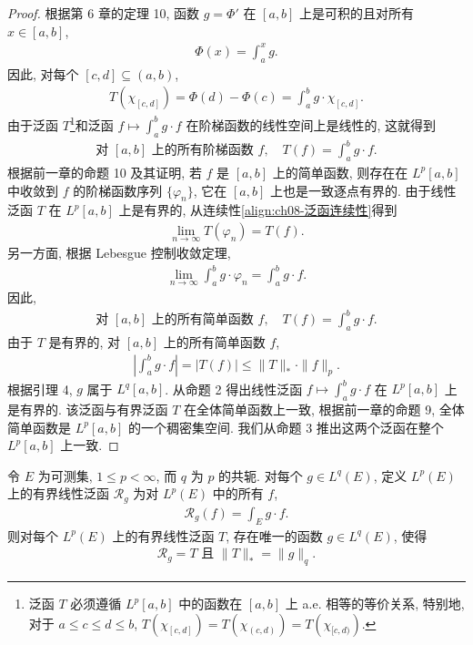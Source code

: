 \documentclass[../../main.tex]{subfiles}
\begin{document}
\begin{proof}
根据第 6 章的定理 10, 函数 $g=\Phi'$ 在 $[a,b]$ 上是可积的且对所有 $x\in[a,b]$,
\begin{align*}
\Phi(x)=\int_{a}^{x}g.
\end{align*}
因此, 对每个 $[c,d]\subseteq(a,b)$,
\begin{align*}
T(\chi_{[c,d]})=\Phi(d)-\Phi(c)=\int_{a}^{b}g\cdot\chi_{[c,d]}.
\end{align*}
由于泛函 $T$\footnote{泛函 $T$ 必须遵循 $L^{p}[a,b]$ 中的函数在 $[a,b]$ 上 a.e. 相等的等价关系, 特别地, 对于 $a\leqslant c\leqslant d\leqslant b$, $T(\chi_{[c,d]})=T(\chi_{(c,d)})=T(\chi_{[c,d)})$.}和泛函 $f\mapsto\int_{a}^{b}g\cdot f$ 在阶梯函数的线性空间上是线性的, 这就得到
\begin{align*}
\text{对 }[a,b]\text{ 上的所有阶梯函数 }f,\quad T(f)=\int_{a}^{b}g\cdot f.
\end{align*}
根据前一章的命题 10 及其证明, 若 $f$ 是 $[a,b]$ 上的简单函数, 则存在在 $L^{p}[a,b]$ 中收敛到 $f$ 的阶梯函数序列 $\{\varphi_{n}\}$, 它在 $[a,b]$ 上也是一致逐点有界的. 由于线性泛函 $T$ 在 $L^{p}[a,b]$ 上是有界的, 从连续性\eqref{align:ch08-泛函连续性}得到
\begin{align*}
\lim_{n\to\infty}T(\varphi_{n})=T(f).
\end{align*}
另一方面, 根据 Lebesgue 控制收敛定理,
\begin{align*}
\lim_{n\to\infty}\int_{a}^{b}g\cdot\varphi_{n}=\int_{a}^{b}g\cdot f.
\end{align*}
因此,
\begin{align*}
\text{对 }[a,b]\text{ 上的所有简单函数 }f,\quad T(f)=\int_{a}^{b}g\cdot f.
\end{align*}
由于 $T$ 是有界的, 对 $[a,b]$ 上的所有简单函数 $f$,
\begin{align*}
\left|\int_{a}^{b}g\cdot f\right|=|T(f)|\leqslant\|T\|_{*}\cdot\|f\|_{p}.
\end{align*}
根据引理 4, $g$ 属于 $L^{q}[a,b]$. 从命题 2 得出线性泛函 $f\mapsto\int_{a}^{b}g\cdot f$ 在 $L^{p}[a,b]$ 上是有界的. 该泛函与有界泛函 $T$ 在全体简单函数上一致, 根据前一章的命题 9, 全体简单函数是 $L^{p}[a,b]$ 的一个稠密集空间. 我们从命题 3 推出这两个泛函在整个 $L^{p}[a,b]$ 上一致.
\end{proof}

\begin{theorem}\label{theorem:ch08-Riesz表示}
令 $E$ 为可测集, $1\leqslant p<\infty$, 而 $q$ 为 $p$ 的共轭. 对每个 $g\in L^{q}(E)$, 定义 $L^{p}(E)$ 上的有界线性泛函 $\mathcal{R}_{g}$ 为对 $L^{p}(E)$ 中的所有 $f$,
\begin{align}
\mathcal{R}_{g}(f)=\int_{E}g\cdot f.\label{align:ch08-Riesz映射}
\end{align}
则对每个 $L^{p}(E)$ 上的有界线性泛函 $T$, 存在唯一的函数 $g\in L^{q}(E)$, 使得
\begin{align}
\mathcal{R}_{g}=T\text{ 且 }\|T\|_{*}=\|g\|_{q}.\label{align:ch08-Riesz结论}
\end{align}
\end{theorem}
\end{document}
